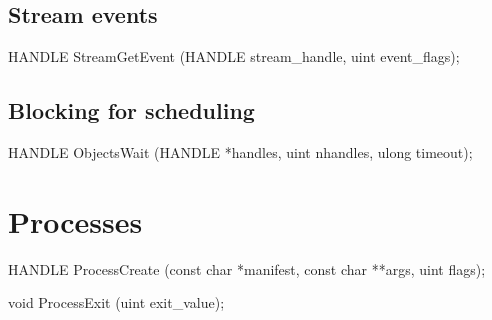 \subsection*{Stream events}

\begin{paldef}
HANDLE StreamGetEvent (HANDLE stream_handle, uint event_flags);
\end{paldef}



\subsection*{Blocking for scheduling}

\begin{paldef}
HANDLE ObjectsWait (HANDLE *handles, uint nhandles,
                    ulong timeout);
\end{paldef}




\section{Processes}
\label{sec:abi:proc}



\begin{paldef}
HANDLE ProcessCreate (const char *manifest,
                      const char **args, uint flags);
\end{paldef}



\begin{paldef}
void ProcessExit (uint exit_value);
\end{paldef}
